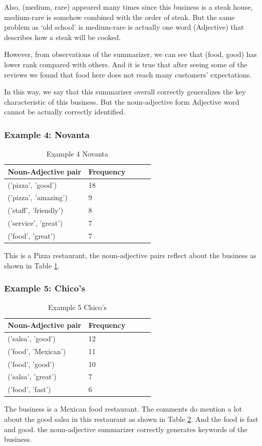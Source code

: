 \documentclass[sigconf]{acmart}
\begin{document}
Also, (medium, rare) appeared many times since this business is a steak house, medium-rare is somehow combined with the order of steak. But the same problem as ‘old school’ is medium-rare is actually one word (Adjective) that describes how a steak will be cooked.

However, from observations of the summarizer, we can see that (food, good) has lower rank compared with others. And it is true that after seeing some of the reviews we found that food here does not reach many customers’ expectations.

In this way, we say that this summarizer overall correctly generalizes the key characteristic of this business. But the noun-adjective form Adjective word cannot be actually correctly identified.

\subsubsection{Example 4: Novanta}
\begin{table}
  \caption{Example 4 Novanta}
  \label{tab:n_adj_4}
  \begin{tabular}{lllll}
    \toprule
    Noun-Adjective pair & Frequency \\
    \midrule
    ('pizza', 'good') & 18\\
    ('pizza', 'amazing') & 9\\
    ('staff', 'friendly') & 8\\
    ('service', 'great') & 7\\
    ('food', 'great') & 7\\
\end{tabular}
\end{table}

This is a Pizza restaurant, the noun-adjective pairs reflect about the business as shown in Table \ref{tab:n_adj_4}.

\subsubsection{Example 5: Chico's}
\begin{table}
  \caption{Example 5 Chico's}
  \label{tab:n_adj_5}
  \begin{tabular}{lllll}
    \toprule
    Noun-Adjective pair & Frequency \\
    \midrule
    ('salsa', 'good') & 12\\
    ('food', 'Mexican') & 11\\
    ('food', 'good') & 10\\
    ('salsa', 'great') & 7\\
    ('food', 'fast') & 6\\
\end{tabular}
\end{table}
The business is a Mexican food restaurant. The comments do mention a lot about the good salsa in this restaurant as shown in Table \ref{tab:n_adj_5}. And the food is fast and good. the noun-adjective summarizer correctly generates keywords of the business.
\end{document}
